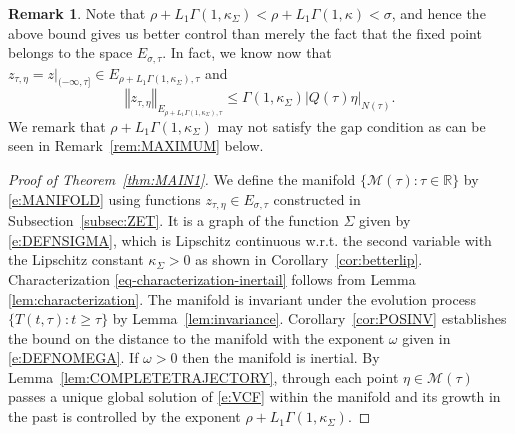 \documentclass[a4paper,11pt,reqno]{amsart}
\theoremstyle{plain}
\theoremstyle{definition}
\newtheorem{rem}[lem]{Remark}
\numberwithin{equation}{section}
\newcommand{\R}{\mathbb{R}}
\newcommand{\calm}{\mathcal M}
\newcommand{\norm}[1]{\left\Vert#1\right\Vert}
\renewcommand{\geq}{\geqslant}
\renewcommand{\leq}{\leqslant}
\begin{document}

\begin{rem}
Note that $\rho+L_1\Gamma(1,\kappa_\Sigma)<\rho+L_1\Gamma(1,\kappa)<\sigma$, and hence the above bound gives us better control than merely the fact that the fixed point belongs to the space $E_{\sigma,\tau}$. In fact, we know now that $z_{\tau,\eta}={z}|_{(-\infty,\tau]}\in E_{\rho+L_1\Gamma(1,\kappa_\Sigma),\tau}$ and $$\norm{z_{\tau,\eta}}_{E_{\rho+L_1\Gamma(1,\kappa_\Sigma),\tau}}\leq\Gamma(1,\kappa_\Sigma)|Q(\tau)\eta|_{N(\tau)}.$$ 
We remark that $\rho+L_1\Gamma(1,\kappa_\Sigma)$ may not satisfy the gap condition as can be seen in Remark~\ref{rem:MAXIMUM} below. 
\end{rem}

\begin{proof}[Proof of Theorem~\ref{thm:MAIN1}]
We define the manifold $\{\calm(\tau)\colon \tau\in\R\}$ by \eqref{e:MANIFOLD} using functions $z_{\tau,\eta}\in E_{\sigma,\tau}$ constructed in Subsection~\ref{subsec:ZET}. It is a graph of the function $\Sigma$ given by \eqref{e:DEFNSIGMA}, which is Lipschitz continuous w.r.t. the second variable with the Lipschitz constant $\kappa_\Sigma>0$ as shown in Corollary~\ref{cor:betterlip}. Characterization \eqref{eq-characterization-inertail} follows from Lemma \ref{lem:characterization}. \color{black} The manifold is 
invariant under the evolution process $\{T(t,\tau)\colon t\geq\tau\}$ by Lemma~\ref{lem:invariance}. Corollary~\ref{cor:POSINV} establishes the bound on the distance to the manifold with the exponent $\omega$ given in \eqref{e:DEFNOMEGA}. If $\omega>0$ then the manifold is inertial. By Lemma~\ref{lem:COMPLETETRAJECTORY}, through each point ${\eta}\in\calm(\tau)$ passes 
{a unique global solution of \eqref{e:VCF}} within the manifold and its growth in the past is controlled by the exponent $\rho+L_1\Gamma(1,\kappa_\Sigma)$.
\end{proof}
\end{document}
